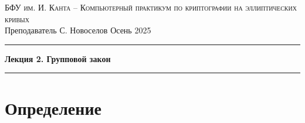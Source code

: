 \documentclass[11pt]{exam}
\theoremstyle{definition}
\begin{document}
	
	{\noindent
		\textsc{БФУ им. И. Канта -- Компьютерный практикум по криптографии на эллиптических кривых }\\[5pt]
		Преподаватель {С. Новоселов}   \hfill{Осень 2025\\}
	\hrule
	\begin{center}
		{\LARGE\textbf{
				Лекция 2. Групповой закон \\[5pt]
		}}
		
	\end{center}
	\hrule \vspace{5mm}
	
	\thispagestyle{empty}
	
	\section{Определение}
	
}
\end{document}
